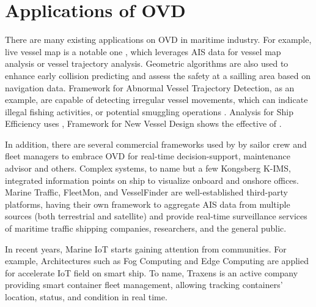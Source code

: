 
\section{Applications of OVD}

There are many existing applications on OVD in maritime industry. For example, live vessel map is a notable one \cite{liu_visualization_2021}, which leverages AIS data for vessel map analysis or vessel trajectory analysis.  Geometric algorithms are also used to enhance early collision predicting and assess the safety at a sailling area based on navigation data.
Framework for Abnormal Vessel Trajectory Detection, as an example, are capable of detecting irregular vessel movements, which can indicate illegal fishing activities, or potential smuggling operations \cite{sidibe_big_2018}. Analysis for Ship Efficiency \cite{aldous_ship_nodate} uses , Framework for New  Vessel Design \cite{sullivan_prospective_2019} shows the effective of .

In addition, there are several commercial frameworks used by by sailor crew and fleet managers to embrace OVD for real-time decision-support, maintenance advisor and others. 
Complex systems, to name but a few Kongsberg K-IMS, integrated information points on ship to visualize onboard and onshore offices. 
Marine Traffic, FleetMon, and VesselFinder are well-established third-party platforms, having their own framework to aggregate AIS data from multiple sources (both terrestrial and satellite) and provide real-time surveillance services of maritime traffic shipping companies, researchers, and the general public.


In recent years, Marine IoT starts gaining attention from communities. For example, Architectures such as Fog Computing and Edge Computing are applied for accelerate IoT field on smart ship. 
To name, Traxens is an active company providing smart container fleet management, allowing tracking containers' location, status, and condition in real time.



